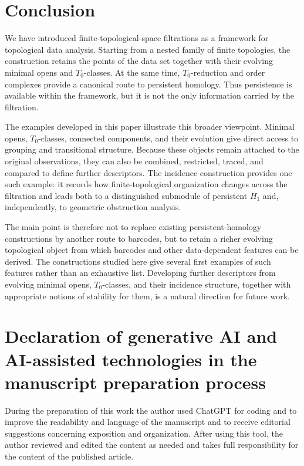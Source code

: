 \documentclass[a4paper,11pt]{article}
\theoremstyle{definition}
\theoremstyle{remark}
\begin{document}
\section{Conclusion}
\label{sec:conclusion}

We have introduced finite-topological-space filtrations as a framework for topological data analysis. Starting from a nested family of finite topologies, the construction retains the points of the data set together with their evolving minimal opens and $T_0$-classes. At the same time, $T_0$-reduction and order complexes provide a canonical route to persistent
homology.  Thus persistence is available within the framework, but it is not the only information carried by the filtration.

The examples developed in this paper illustrate this broader viewpoint. Minimal opens, $T_0$-classes, connected components, and their evolution give direct access to grouping and transitional structure.  Because these objects remain attached to the original observations, they can also be combined, restricted, traced, and compared to define further descriptors. The incidence construction provides one such example: it records how finite-topological organization changes across the filtration and leads both to a distinguished submodule of persistent $H_1$ and, independently, to geometric obstruction analysis.

The main point is therefore not to replace existing persistent-homology constructions by another route to barcodes, but to retain a richer evolving topological object from which barcodes and other data-dependent features can be derived. The constructions studied here give several first examples of such features rather than an exhaustive list. Developing further descriptors from evolving minimal opens, $T_0$-classes, and their incidence structure, together with appropriate notions of stability for them, is a natural direction for future work.


\section*{Declaration of generative AI and AI-assisted technologies in the manuscript preparation process}

During the preparation of this work the author used ChatGPT for coding and to improve the readability and language of the manuscript and to receive editorial suggestions concerning exposition and organization. After using this tool, the author reviewed and edited the content as needed and takes full responsibility for the content of the published article.
\end{document}
